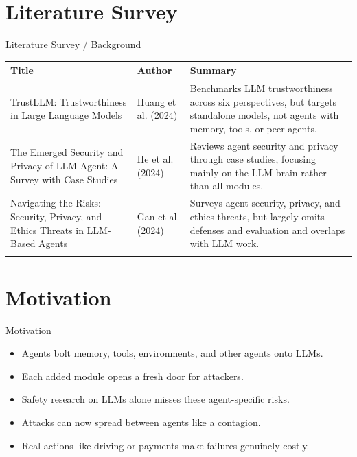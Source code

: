 \documentclass[10pt]{beamer}
\begin{document}
\section{Literature Survey}
\begin{frame}{Literature Survey / Background}
  \small
  \begin{tabular}{@{}p{2.7cm}p{2.3cm}p{5.6cm}@{}}
    \toprule
    \textbf{Title} & \textbf{Author} & \textbf{Summary} \\
    \midrule
    TrustLLM: Trustworthiness in Large Language Models & Huang et al. (2024) & Benchmarks LLM trustworthiness across six perspectives, but targets standalone models, not agents with memory, tools, or peer agents. \\
    \addlinespace
    The Emerged Security and Privacy of LLM Agent: A Survey with Case Studies & He et al. (2024) & Reviews agent security and privacy through case studies, focusing mainly on the LLM brain rather than all modules. \\
    \addlinespace
    Navigating the Risks: Security, Privacy, and Ethics Threats in LLM-Based Agents & Gan et al. (2024) & Surveys agent security, privacy, and ethics threats, but largely omits defenses and evaluation and overlaps with LLM work. \\
    \addlinespace
    \bottomrule
  \end{tabular}
\end{frame}
\section{Motivation}
\begin{frame}{Motivation}
\begin{itemize}
  \item Agents bolt memory, tools, environments, and other agents onto LLMs.
  \item Each added module opens a fresh door for attackers.
  \item Safety research on LLMs alone misses these agent-specific risks.
  \item Attacks can now spread between agents like a contagion.
  \item Real actions like driving or payments make failures genuinely costly.
\end{itemize}
\end{frame}
\end{document}
